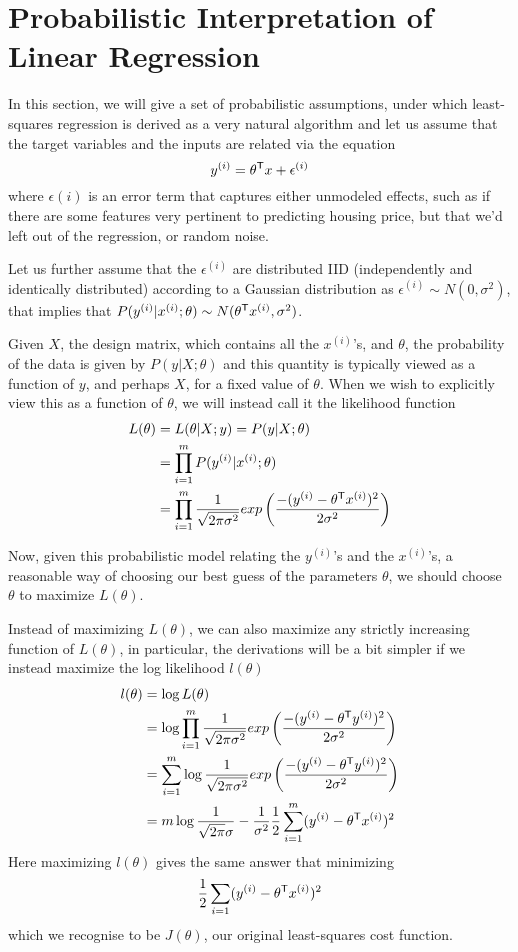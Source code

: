 \section{Probabilistic Interpretation of Linear Regression}
In this section, we will give a set of probabilistic assumptions, under which least-squares regression
is derived as a very natural algorithm and let us assume that the target variables and the inputs 
are related via the equation
\[ y^{(i)} = \theta ^ \mathsf{T} x + \epsilon ^{(i)} \]
where $\epsilon{(i)}$ is an error term that captures either unmodeled effects, such as if there are some features
very pertinent to predicting housing price, but that we’d left out of the regression, or random noise.

Let us further assume that the $\epsilon^{(i)}$ are distributed IID (independently and identically distributed)
according to a Gaussian distribution as $\epsilon^{(i)} \sim N(0, \sigma^2)$, that implies that 
$P(y^{(i)} | x^{(i)} ; \theta) \sim N(\theta ^ \mathsf{T}x^{(i)}, \sigma^2)$.

Given $X$, the design matrix, which contains all the $x^{(i)}$’s, and $\theta$, 
the probability of the data is given by $P(y| X; \theta)$ and this quantity is typically viewed 
as a function of $y$, and perhaps $X$, for a fixed value of $\theta$.\newline
When we wish to explicitly view this as a function of $\theta$, we will instead call it the likelihood function
\begin{align*}
    L(\theta) & = L(\theta | X; y) = P(y | X; \theta) \\
              & = \prod _{i = 1} ^ m P(y^{(i)} | x^{(i)}; \theta) \\
              & = \prod _{i = 1} ^ m \frac{1}{\sqrt{2 \pi \sigma ^ 2}} exp \left(\frac{-(y^{(i)} - \theta ^ \mathsf{T}x^{(i)})^2}{2 \sigma ^ 2}\right) \\
\end{align*}

Now, given this probabilistic model relating the $y^{(i)}$’s and the $x^{(i)}$’s, a reasonable way
of choosing our best guess of the parameters $\theta$, we should choose $\theta$ to maximize $L(\theta)$.

Instead of maximizing $L(\theta)$, we can also maximize any strictly increasing function of $L(\theta)$, 
in particular, the derivations will be a bit simpler if we  instead maximize the log likelihood $l(\theta)$
\begin{align*}
    l(\theta) & = \log L(\theta) \\
              & = \log \prod _{i=1} ^ m \frac{1}{\sqrt{2 \pi \sigma ^ 2}} exp \left(\frac{-(y^{(i)} - \theta ^ \mathsf{T}y^{(i)})^2}{2 \sigma ^ 2}\right) \\
              & = \sum _{i = 1} ^ m \log \frac{1}{\sqrt{2 \pi \sigma^2}} exp \left(\frac{-(y^{(i)} - \theta ^ \mathsf{T}y^{(i)})^2}{2 \sigma^2}\right) \\
              & = m \log \frac{1}{\sqrt{2 \pi} \sigma} - 
                  \frac{1}{\sigma^2} \frac{1}{2} \sum _{i=1}^m (y^{(i)} - \theta ^ \mathsf{T}x^{(i)})^2 \\
\end{align*}
Here maximizing $l(\theta)$ gives the same answer that minimizing
\[ \frac{1}{2} \sum _{i = 1} (y^{(i)} - \theta ^ \mathsf{T}x^{(i)})^2 \]
which we recognise to be $J(\theta)$, our original least-squares cost function.

